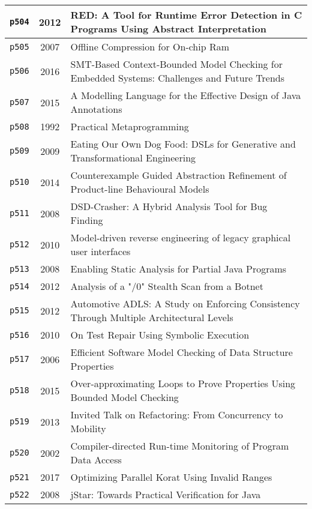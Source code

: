 \begin{longtable}{| c | c | p{16cm} |}
  \hline
  \texttt{p504} & 2012 & RED: A Tool for Runtime Error Detection in C Programs Using Abstract Interpretation \\
  \hline
  \texttt{p505} & 2007 & Offline Compression for On-chip Ram \\
  \hline
  \texttt{p506} & 2016 & SMT-Based Context-Bounded Model Checking for Embedded Systems: Challenges and Future Trends \\
  \hline
  \texttt{p507} & 2015 & A Modelling Language for the Effective Design of Java Annotations \\
  \hline
  \texttt{p508} & 1992 & Practical Metaprogramming \\
  \hline
  \texttt{p509} & 2009 & Eating Our Own Dog Food: DSLs for Generative and Transformational Engineering \\
  \hline
  \texttt{p510} & 2014 & Counterexample Guided Abstraction Refinement of Product-line Behavioural Models \\
  \hline
  \texttt{p511} & 2008 & DSD-Crasher: A Hybrid Analysis Tool for Bug Finding \\
  \hline
  \texttt{p512} & 2010 & Model-driven reverse engineering of legacy graphical user interfaces \\
  \hline
  \texttt{p513} & 2008 & Enabling Static Analysis for Partial Java Programs \\
  \hline
  \texttt{p514} & 2012 & Analysis of a "/0" Stealth Scan from a Botnet \\
  \hline
  \texttt{p515} & 2012 & Automotive ADLS: A Study on Enforcing Consistency Through Multiple Architectural Levels \\
  \hline
  \texttt{p516} & 2010 & On Test Repair Using Symbolic Execution \\
  \hline
  \texttt{p517} & 2006 & Efficient Software Model Checking of Data Structure Properties \\
  \hline
  \texttt{p518} & 2015 & Over-approximating Loops to Prove Properties Using Bounded Model Checking \\
  \hline
  \texttt{p519} & 2013 & Invited Talk on Refactoring: From Concurrency to Mobility \\
  \hline
  \texttt{p520} & 2002 & Compiler-directed Run-time Monitoring of Program Data Access \\
  \hline
  \texttt{p521} & 2017 & Optimizing Parallel Korat Using Invalid Ranges \\
  \hline
  \texttt{p522} & 2008 & jStar: Towards Practical Verification for Java \\

\end{longtable}
